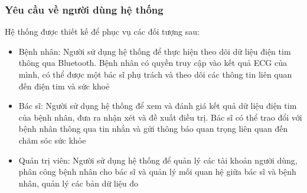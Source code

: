 \subsubsection{Yêu cầu về người dùng hệ thống}
Hệ thống được thiết kế để phục vụ các đối tượng sau:
\begin{adjustwidth}{1.5em}{}
\begin{itemize}
    \item Bệnh nhân: Người sử dụng hệ thống để thực hiện theo dõi dữ liệu điện tim thông qua Bluetooth. Bệnh nhân có quyền truy cập vào kết quả ECG của mình, có thể được một bác sĩ phụ trách và theo dõi các thông tin liên quan đến điện tim và sức khoẻ
    \item Bác sĩ: Người sử dụng hệ thống để xem và đánh giá kết quả dữ liệu điện tim của bệnh nhân, đưa ra nhận xét và đề xuất điều trị. Bác sĩ có thể trao đổi với bệnh nhân thông qua tin nhắn và gửi thông báo quan trọng liên quan đến chăm sóc sức khỏe
    \item Quản trị viên: Người sử dụng hệ thống để quản lý các tài khoản người dùng, phân công bệnh nhân cho bác sĩ và quản lý mối quan hệ giữa bác sĩ và bệnh nhân, quản lý các bản dữ liệu đo
\end{itemize}
\end{adjustwidth}

